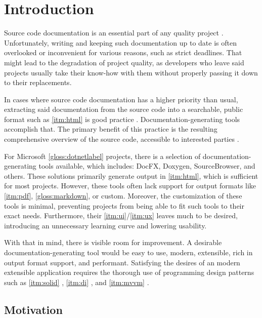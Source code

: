 \chapter*{Introduction}

Source code documentation is an essential part of any quality project \cite{rachel_why_2018}. Unfortunately, writing and keeping such documentation up to date is often overlooked or inconvenient for various reasons, such as strict deadlines. That might lead to the degradation of project quality, as developers who leave said projects usually take their know-how with them without properly passing it down to their replacements.

In cases where source code documentation has a higher priority than usual, extracting said documentation from the source code into a searchable, public format such as \ref{itm:html} is good practice \cite{smrita_benefits_2014}. Documentation-generating tools accomplish that. The primary benefit of this practice is the resulting comprehensive overview of the source code, accessible to interested parties \cite{smrita_benefits_2014}.

For Microsoft \ref{gloss:dotnetlabel} projects, there is a selection of documentation-generating tools available, which includes: DocFX, Doxygen, SourceBrowser, and others. These solutions primarily generate output in \ref{itm:html}, which is sufficient for most projects. However, these tools often lack support for output formats like \ref{itm:pdf}, \ref{gloss:markdown}, or custom. Moreover, the customization of these tools is minimal, preventing projects from being able to fit such tools to their exact needs. Furthermore, their \ref{itm:ui}/\ref{itm:ux} leaves much to be desired, introducing an unnecessary learning curve and lowering usability.

With that in mind, there is visible room for improvement. A desirable documentation-generating tool would be easy to use, modern, extensible, rich in output format support, and performant. Satisfying the desires of an modern extensible application requires the thorough use of programming design patterns \cite{humblot_design_2021} such as \ref{itm:solid} \cite{hall_adaptive_2017}, \ref{itm:di} \cite{deursen_dependency_2019}, and \ref{itm:mvvm} \cite{katz_mvvm_2022}.

\section*{Motivation}

